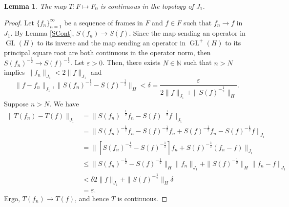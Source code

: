 \documentclass{article}
\newtheorem{lemma}[defn]{Lemma}
\newcommand{\GL}{\operatorname{GL}}
\newcommand{\eps}{\varepsilon}
\newcommand{\NN}{\mathbb{N}}
\begin{document}
\begin{lemma} \label{TCont}
The map $T:F\mapsto F_0$ is continuous in the topology of $J_1$.
\end{lemma}
\begin{proof}
Let $\{f_n\}_{n=1}^\infty$ be a sequence of frames in $F$ and $f\in F$ such that $f_n\rightarrow f$ in $J_1$. By Lemma \ref{SCont}, $S(f_n)\rightarrow S(f)$. Since the map sending an operator in $\GL(H)$ to its inverse and the map sending an operator in $\GL^+(H)$ to its principal square root are both continuous in the operator norm, then $S(f_n)^{-\frac{1}{2}}\rightarrow S(f)^{-\frac{1}{2}}$. Let $\eps>0$. Then, there exists $N\in\NN$ such that $n>N$ implies $\|f_n\|_{J_1}<2\|f\|_{J_1}$ and
\[ \|f-f_n\|_{J_1},\|S(f_n)^{-\frac{1}{2}}-S(f)^{-\frac{1}{2}}\|_H < \delta=\frac{\eps}{2\|f\|_{J_1}+\|S(f)^{-\frac{1}{2}}\|_H}. \]
Suppose $n>N$. We have
\begin{align*}
\|T(f_n)-T(f)\|_{J_1}
&= \|S(f_n)^{-\frac{1}{2}}f_n-S(f)^{-\frac{1}{2}}f\|_{J_1} \\
&= \|S(f_n)^{-\frac{1}{2}}f_n-S(f)^{-\frac{1}{2}}f_n+S(f)^{-\frac{1}{2}}f_n-S(f)^{-\frac{1}{2}}f\|_{J_1} \\
&= \|[S(f_n)^{-\frac{1}{2}}-S(f)^{-\frac{1}{2}}]f_n+S(f)^{-\frac{1}{2}}(f_n-f)\|_{J_1} \\
&\leq \|S(f_n)^{-\frac{1}{2}}-S(f)^{-\frac{1}{2}}\|_H\|f_n\|_{J_1}+\|S(f)^{-\frac{1}{2}}\|_H\|f_n-f\|_{J_1} \\
&< \delta 2\|f\|_{J_1} + \|S(f)^{-\frac{1}{2}}\|_H\delta \\
&= \eps.
\end{align*}
Ergo, $T(f_n)\rightarrow T(f)$, and hence $T$ is continuous.
\end{proof}
\end{document}
